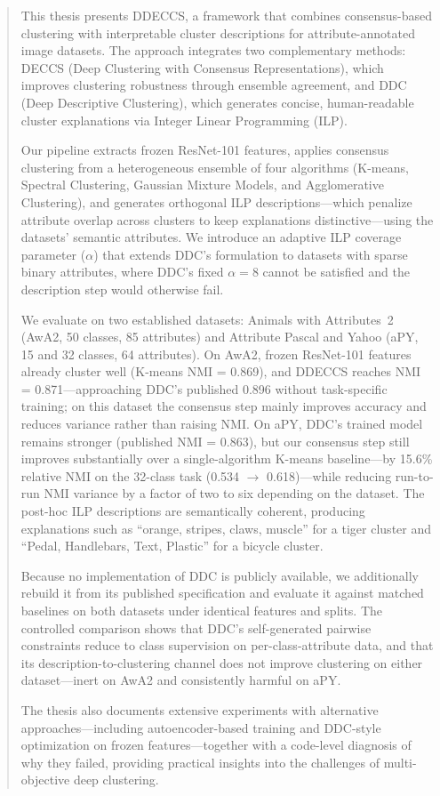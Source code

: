 \documentclass[12pt,a4paper]{report}
\begin{document}
\begin{abstract}
    This thesis presents DDECCS, a framework that combines consensus-based clustering with interpretable cluster descriptions for attribute-annotated image datasets. The approach integrates two complementary methods: DECCS (Deep Clustering with Consensus Representations), which improves clustering robustness through ensemble agreement, and DDC (Deep Descriptive Clustering), which generates concise, human-readable cluster explanations via Integer Linear Programming (ILP).

    Our pipeline extracts frozen ResNet-101 features, applies consensus clustering from a heterogeneous ensemble of four algorithms (K-means, Spectral Clustering, Gaussian Mixture Models, and Agglomerative Clustering), and generates orthogonal ILP descriptions---which penalize attribute overlap across clusters to keep explanations distinctive---using the datasets' semantic attributes. We introduce an adaptive ILP coverage parameter ($\alpha$) that extends DDC's formulation to datasets with sparse binary attributes, where DDC's fixed $\alpha = 8$ cannot be satisfied and the description step would otherwise fail.

    We evaluate on two established datasets: Animals with Attributes~2 (AwA2, 50 classes, 85 attributes) and Attribute Pascal and Yahoo (aPY, 15 and 32 classes, 64 attributes). On AwA2, frozen ResNet-101 features already cluster well (K-means NMI = 0.869), and DDECCS reaches NMI = 0.871---approaching DDC's published 0.896 without task-specific training; on this dataset the consensus step mainly improves accuracy and reduces variance rather than raising NMI. On aPY, DDC's trained model remains stronger (published NMI = 0.863), but our consensus step still improves substantially over a single-algorithm K-means baseline---by 15.6\% relative NMI on the 32-class task (0.534 $\to$ 0.618)---while reducing run-to-run NMI variance by a factor of two to six depending on the dataset. The post-hoc ILP descriptions are semantically coherent, producing explanations such as ``orange, stripes, claws, muscle'' for a tiger cluster and ``Pedal, Handlebars, Text, Plastic'' for a bicycle cluster.

    Because no implementation of DDC is publicly available, we additionally rebuild it from its published specification and evaluate it against matched baselines on both datasets under identical features and splits. The controlled comparison shows that DDC's self-generated pairwise constraints reduce to class supervision on per-class-attribute data, and that its description-to-clustering channel does not improve clustering on either dataset---inert on AwA2 and consistently harmful on aPY.

    The thesis also documents extensive experiments with alternative approaches---including autoencoder-based training and DDC-style optimization on frozen features---together with a code-level diagnosis of why they failed, providing practical insights into the challenges of multi-objective deep clustering.
\end{abstract}
\end{document}
